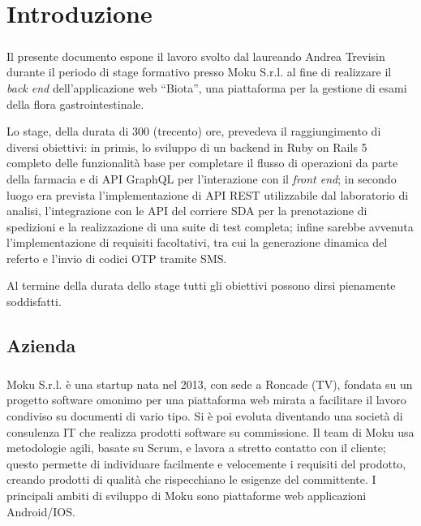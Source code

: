 \chapter{Introduzione}
\label{introduction}
\paragraph{}
Il presente documento espone il lavoro svolto dal laureando Andrea Trevisin durante il periodo di stage formativo presso Moku S.r.l. al fine di realizzare il \textit{back end} dell'applicazione web ``Biota'', una piattaforma per la gestione di esami della flora gastrointestinale.

Lo stage, della durata di 300 (trecento) ore, prevedeva il raggiungimento di diversi obiettivi: in primis, lo sviluppo di un backend in Ruby on Rails 5 completo delle funzionalità base per completare il flusso di operazioni da parte della farmacia e di API GraphQL per l'interazione con il \textit{front end}; in secondo luogo era prevista l'implementazione di API REST utilizzabile dal laboratorio di analisi, l'integrazione con le API del corriere SDA per la prenotazione di spedizioni e la realizzazione di una suite di test completa; infine sarebbe avvenuta l'implementazione di requisiti facoltativi, tra cui la generazione dinamica del referto e l'invio di codici OTP tramite SMS.

Al termine della durata dello stage tutti gli obiettivi possono dirsi pienamente soddisfatti.

\section{Azienda}
\paragraph{}
Moku S.r.l. è una startup nata nel 2013, con sede a Roncade (TV), fondata su un progetto software omonimo per una piattaforma web mirata a facilitare il lavoro condiviso su documenti di vario tipo. Si è poi evoluta diventando una società di consulenza IT che realizza prodotti software su commissione. 
Il team di Moku usa metodologie agili, basate su Scrum, e lavora a stretto contatto con il cliente; questo permette di individuare facilmente e velocemente i requisiti del prodotto, creando prodotti di qualità che rispecchiano le esigenze del committente. I principali ambiti di sviluppo di Moku sono piattaforme web applicazioni Android/IOS.

